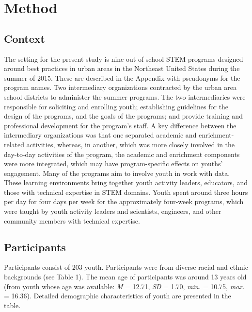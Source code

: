 \documentclass[]{book}
\theoremstyle{definition}
\theoremstyle{definition}
\theoremstyle{definition}
\theoremstyle{remark}
\begin{document}
\chapter{Method}\label{method}

\section{Context}\label{context}

The setting for the present study is nine out-of-school STEM programs
designed around best practices in urban areas in the Northeast United
States during the summer of 2015. These are described in the Appendix
with pseudonyms for the program names. Two intermediary organizations
contracted by the urban area school districts to administer the summer
programs. The two intermediaries were responsible for soliciting and
enrolling youth; establishing guidelines for the design of the programs,
and the goals of the programs; and provide training and professional
development for the program's staff. A key difference between the
intermediary organizations was that one separated academic and
enrichment-related activities, whereas, in another, which was more
closely involved in the day-to-day activities of the program, the
academic and enrichment components were more integrated, which may have
program-specific effects on youths' engagement. Many of the programs aim
to involve youth in work with data. These learning environments bring
together youth activity leaders, educators, and those with technical
expertise in STEM domains. Youth spent around three hours per day for
four days per week for the approximately four-week programs, which were
taught by youth activity leaders and scientists, engineers, and other
community members with technical expertise.

\section{Participants}\label{participants}

Participants consist of 203 youth. Participants were from diverse racial
and ethnic backgrounds (see Table 1). The mean age of participants was
around 13 years old (from youth whose age was available: \emph{M} =
12.71, \emph{SD} = 1.70, \emph{min.} = 10.75, \emph{max.} = 16.36).
Detailed demographic characteristics of youth are presented in the
table.
\end{document}
